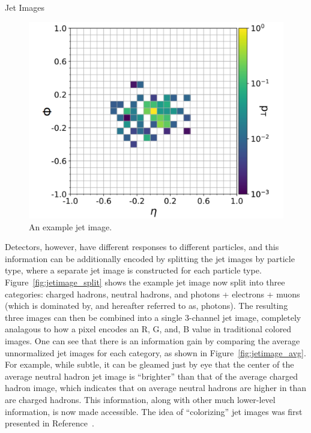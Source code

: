 \begin{section}{Jet Images}
\begin{figure}[tbp!]
\begin{center}
\includegraphics[angle=0,width=0.80\columnwidth]{fig/jetimage.pdf}
\end{center}
\caption{An example jet image.}
\label{fig:jetimage}
\end{figure}

Detectors, however, have different responses to different particles, and this information can be additionally encoded by splitting the jet images by particle type, where a separate jet image is constructed for each particle type. 
Figure~\ref{fig:jetimage_split} shows the example jet image now split into three categories: charged hadrons, neutral hadrons, and photons + electrons + muons (which is dominated by, and hereafter referred to as, photons).
The resulting three images can then be combined into a single 3-channel jet image, completely analagous to how a pixel encodes an R, G, and, B value in traditional colored images.
One can see that there is an information gain by comparing the average unnormalized jet images for each category, as shown in Figure~\ref{fig:jetimage_avg}.
For example, while subtle, it can be gleamed just by eye that the center of the average neutral hadron jet image is ``brighter'' than that of the average charged hadron image, which indicates that on average neutral hadrons are higher in \pT than are charged hadrons.
This information, along with other much lower-level information, is now made accessible.
The idea of ``colorizing'' jet images was first presented in Reference~\cite{Komiske:2016rsd}.


\end{section}
